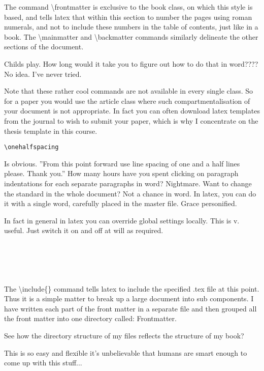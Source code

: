 The command {\textbackslash}frontmatter is exclusive to the book class, on which this style is based, and tells latex that within this section to number the pages using roman numerals, and not to include these numbers in the table of contents, just like in a book. The {\textbackslash}mainmatter and {\textbackslash}backmatter commands similarly delineate the other sections of the document.  

Childs play.  How long would it take you to figure out how to do that in word???? No idea. I've never tried.

Note that these rather cool commands are not available in every single class. So for a paper you would use the article class where such compartmentalisation of your document is not appropriate. In fact you can often download latex templates from the journal to wish to submit your paper, which is why I concentrate on the thesis template in this course.

\begin{verbatim}
\onehalfspacing
\end{verbatim}

Is obvious. ''From this point forward use line spacing of one and a half lines please. Thank you.'' How many hours have you spent clicking on paragraph indentations for each separate paragraphs in word? Nightmare. Want to change the standard in the whole document? Not a chance in word. In latex, you can do it with a single word, carefully placed in the master file. Grace personified. 

In fact in general in latex you can override global settings locally.  This is v. useful. Just switch it on and off at will as required.

\begin{verbatim}





\end{verbatim}

The {\textbackslash}include\{\} command tells latex to include the specified .tex file at this point.  Thus it is a simple matter to break up a large document into sub components.  I have written each part of the front matter in a separate file and then grouped all the front matter into one directory called: Frontmatter.

See how the directory structure of my files reflects the structure of my book?

This is so easy and flexible it's unbelievable that humans are smart enough to come up with this stuff...

